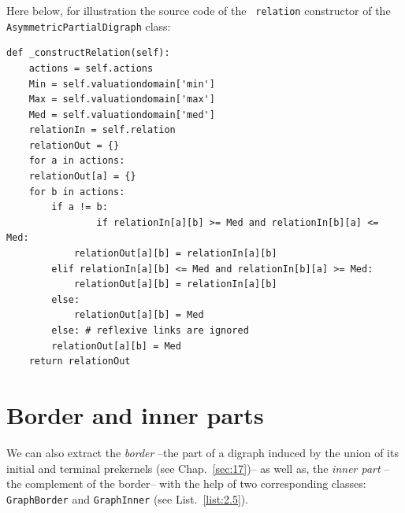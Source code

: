 Here below, for illustration the source code of the \texttt{ relation} constructor of the \texttt{AsymmetricPartialDigraph} class:
\begin{lstlisting}[caption={Computing the asymmetric part of a bipolar-valued relation},label=list:2.4,basicstyle=\ttfamily\scriptsize]
def _constructRelation(self):
    actions = self.actions
    Min = self.valuationdomain['min']
    Max = self.valuationdomain['max']
    Med = self.valuationdomain['med']
    relationIn = self.relation
    relationOut = {}
    for a in actions:
	relationOut[a] = {}
	for b in actions:
	    if a != b:
                if relationIn[a][b] >= Med and relationIn[b][a] <= Med:
		    relationOut[a][b] = relationIn[a][b]
		elif relationIn[a][b] <= Med and relationIn[b][a] >= Med:
		    relationOut[a][b] = relationIn[a][b]
		else:
		    relationOut[a][b] = Med
	    else: # reflexive links are ignored
		relationOut[a][b] = Med
    return relationOut
\end{lstlisting}

\section{Border and inner parts}
\label{sec:2.4}

We can also extract the \emph{border} --the part of a digraph induced by the union of its initial and terminal prekernels (see Chap.~\ref{sec:17})--  as well as, the \emph{inner part} --the complement of the border-- with the help of two corresponding classes: \texttt{GraphBorder} and \texttt{GraphInner} (see List.~\vref{list:2.5}).

